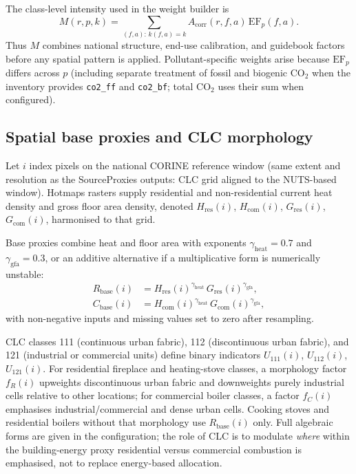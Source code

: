 The class-level intensity used in the weight builder is
\begin{equation}
  M(r,p,k) = \sum_{(f,a):\, k(f,a)=k} A_{\mathrm{corr}}(r,f,a)\,
             \mathrm{EF}_p(f,a).
\end{equation}
Thus $M$ combines national structure, end-use calibration, and guidebook
factors before any spatial pattern is applied. Pollutant-specific weights arise
because $\mathrm{EF}_p$ differs across $p$ (including separate treatment of
fossil and biogenic CO$_2$ when the inventory provides \texttt{co2\_ff} and
\texttt{co2\_bf}; total CO$_2$ uses their sum when configured).

\subsection{Spatial base proxies and CLC morphology}

Let $i$ index pixels on the national CORINE reference window (same extent and
resolution as the SourceProxies outputs: CLC grid aligned to the NUTS-based
window). Hotmaps rasters supply residential and non-residential current heat
density and gross floor area density, denoted
$H_{\mathrm{res}}(i)$, $H_{\mathrm{com}}(i)$,
$G_{\mathrm{res}}(i)$, $G_{\mathrm{com}}(i)$, harmonised to that grid.

Base proxies combine heat and floor area with exponents
$\gamma_{\mathrm{heat}}=0.7$ and $\gamma_{\mathrm{gfa}}=0.3$, or an additive
alternative if a multiplicative form is numerically unstable:
\begin{align}
  R_{\mathrm{base}}(i) &=
  H_{\mathrm{res}}(i)^{\gamma_{\mathrm{heat}}}\,
  G_{\mathrm{res}}(i)^{\gamma_{\mathrm{gfa}}},
  \\
  C_{\mathrm{base}}(i) &=
  H_{\mathrm{com}}(i)^{\gamma_{\mathrm{heat}}}\,
  G_{\mathrm{com}}(i)^{\gamma_{\mathrm{gfa}}},
\end{align}
with non-negative inputs and missing values set to zero after resampling.

CLC classes 111 (continuous urban fabric), 112 (discontinuous urban fabric), and
121 (industrial or commercial units) define binary indicators
$U_{111}(i)$, $U_{112}(i)$, $U_{121}(i)$.
For residential fireplace and heating-stove classes, a morphology factor
$f_R(i)$ upweights discontinuous urban fabric and downweights purely industrial
cells relative to other locations; for commercial boiler classes, a factor
$f_C(i)$ emphasises industrial/commercial and dense urban cells. Cooking stoves
and residential boilers without that morphology use $R_{\mathrm{base}}(i)$ only.
Full algebraic forms are given in the configuration; the role of CLC is to
modulate \emph{where} within the building-energy proxy residential versus
commercial combustion is emphasised, not to replace energy-based allocation.

